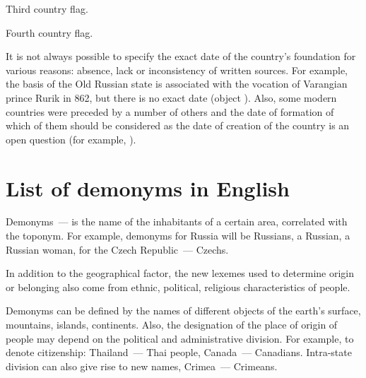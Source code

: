 \begin{marginfigure}[0.0cm]
	{
		\setlength{\fboxsep}{0pt}%
		\setlength{\fboxrule}{1pt}%
	}
	\caption{Third country flag.}%
	\label{fig:flag_singapore}%
\end{marginfigure}

\begin{marginfigure}[4.0cm]
	{
		\setlength{\fboxsep}{0pt}%
		\setlength{\fboxrule}{1pt}%
	}
	\caption{Fourth country flag.}%
	\label{fig:flag_israel}%
\end{marginfigure}

It is not always possible to specify the exact date of the country's foundation for various reasons: absence, lack or inconsistency of written sources. For example, the basis of the Old Russian state is associated with the vocation of Varangian prince Rurik in 862, but there is no exact date (object ). Also, some modern countries were preceded by a number of others and the date of formation of which of them should be considered as the date of creation of the country is an open question (for example, ).


\section{List of demonyms in English}

Demonyms~--- is the name of the inhabitants of a certain area, correlated with the toponym. For example, demonyms for Russia will be Russians, a Russian, a Russian woman, for the Czech Republic~--- Czechs.

In addition to the geographical factor, the new lexemes used to determine origin or belonging also come from ethnic, political, religious characteristics of people.

Demonyms can be defined by the names of different objects of the earth's surface, mountains, islands, continents. Also, the designation of the place of origin of people may depend on the political and administrative division. For example, to denote citizenship: Thailand~--- Thai people, Canada~--- Canadians. Intra-state division can also give rise to new names, Crimea~--- Crimeans.

